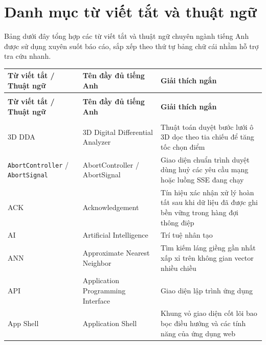 
\chapter*{Danh mục từ viết tắt và thuật ngữ}
\label{chap:tu-viet-tat}

Bảng dưới đây tổng hợp các từ viết tắt và thuật ngữ chuyên ngành tiếng Anh được sử dụng xuyên suốt báo cáo, sắp xếp theo thứ tự bảng chữ cái nhằm hỗ trợ tra cứu nhanh.

{\footnotesize
\setlength{\tabcolsep}{5pt}
\begin{longtable}{@{}>{\raggedright\arraybackslash}p{3.4cm}>{\raggedright\arraybackslash}p{4.7cm}>{\raggedright\arraybackslash}p{7.15cm}@{}}
    \toprule
    \textbf{Từ viết tắt / Thuật ngữ} & \textbf{Tên đầy đủ tiếng Anh} & \textbf{Giải thích ngắn} \\
    \midrule
    \endfirsthead
    \multicolumn{3}{@{}l}{\textit{Danh mục từ viết tắt và thuật ngữ (tiếp theo)}} \\[4pt]
    \toprule
    \textbf{Từ viết tắt / Thuật ngữ} & \textbf{Tên đầy đủ tiếng Anh} & \textbf{Giải thích ngắn} \\
    \midrule
    \endhead
    \midrule
    \multicolumn{3}{r@{}}{\textit{Xem tiếp ở trang sau}} \\
    \endfoot
    \bottomrule
    \endlastfoot
    3D DDA & 3D Digital Differential Analyzer & Thuật toán duyệt bước lưới ô 3D dọc theo tia chiếu để tăng tốc chọn điểm \\
    \texttt{AbortController} / \texttt{AbortSignal} & AbortController / AbortSignal & Giao diện chuẩn trình duyệt dùng huỷ các yêu cầu mạng hoặc luồng SSE đang chạy \\
    ACK & Acknowledgement & Tín hiệu xác nhận xử lý hoàn tất sau khi dữ liệu đã được ghi bền vững trong hàng đợi thông điệp \\
    AI & Artificial Intelligence & Trí tuệ nhân tạo \\
    ANN & Approximate Nearest Neighbor & Tìm kiếm láng giềng gần nhất xấp xỉ trên không gian vector nhiều chiều \\
    API & Application Programming Interface & Giao diện lập trình ứng dụng \\
    App Shell & Application Shell & Khung vỏ giao diện cốt lõi bao bọc điều hướng và các tính năng của ứng dụng web \\

\end{longtable}}
